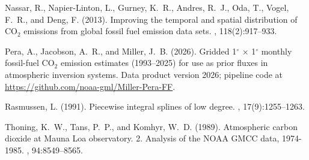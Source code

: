 \documentclass[11pt,openany]{book}
\begin{document}
\begin{thebibliography}{}
Nassar, R., Napier-{L}inton, L., Gurney, K.~R., Andres, R.~J., Oda, T., Vogel,
  F.~R., and Deng, F. (2013).
\newblock Improving the temporal and spatial distribution of {CO}$_2$ emissions
  from global fossil fuel emission data sets.
, 118(2):917--933.

Pera, A., Jacobson, A.~R., and Miller, J.~B. (2026).
\newblock Gridded 1$^{\circ}$ $\times$ 1$^{\circ}$ monthly fossil-fuel {CO}$_2$
  emission estimates (1993--2025) for use as prior fluxes in atmospheric
  inversion systems.
\newblock Data product version 2026; pipeline code at
  \url{https://github.com/noaa-gml/Miller-Pera-FF}.

Rasmussen, L. (1991).
\newblock Piecewise integral splines of low degree.
, 17(9):1255--1263.

Thoning, K.~W., Tans, P.~P., and Komhyr, W.~D. (1989).
\newblock Atmospheric carbon dioxide at {M}auna {L}oa observatory. 2.
  {A}nalysis of the {NOAA} {GMCC} data, 1974-1985.
, 94:8549--8565.

\end{thebibliography}
\end{document}
